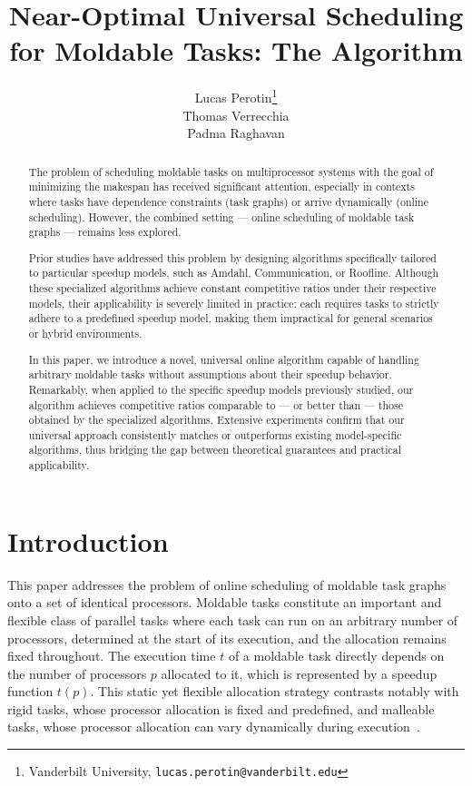 \documentclass{article}
\title{Near-Optimal Universal Scheduling for Moldable Tasks: The \fair Algorithm}
\author{
  Lucas Perotin\thanks{Vanderbilt University, \texttt{lucas.perotin@vanderbilt.edu}} \\
  Thomas Verrecchia \\
  Padma Raghavan\footnotemark[1]
}
\begin{document}
\maketitle
\begin{abstract}
The problem of scheduling moldable tasks on multiprocessor systems with the goal of minimizing the makespan has received significant attention, especially in contexts where tasks have dependence constraints (task graphs) or arrive dynamically (online scheduling). However, the combined setting — online scheduling of moldable task graphs — remains less explored.

Prior studies have addressed this problem by designing algorithms specifically tailored to particular speedup models, such as Amdahl, Communication, or Roofline. Although these specialized algorithms achieve constant competitive ratios under their respective models, their applicability is severely limited in practice: each requires tasks to strictly adhere to a predefined speedup model, making them impractical for general scenarios or hybrid environments.

In this paper, we introduce a novel, universal online algorithm capable of handling arbitrary moldable tasks without assumptions about their speedup behavior. Remarkably, when applied to the specific speedup models previously studied, our algorithm achieves competitive ratios comparable to — or better than — those obtained by the specialized algorithms. Extensive experiments confirm that our universal approach consistently matches or outperforms existing model-specific algorithms, thus bridging the gap between theoretical guarantees and practical applicability.
\end{abstract}
\section{Introduction}

This paper addresses the problem of online scheduling of moldable task graphs onto a set of identical processors. Moldable tasks constitute an important and flexible class of parallel tasks where each task can run on an arbitrary number of processors, determined at the start of its execution, and the allocation remains fixed throughout. The execution time $t$ of a moldable task directly depends on the number of processors $p$ allocated to it, which is represented by a speedup function $t(p)$. This static yet flexible allocation strategy contrasts notably with rigid tasks, whose processor allocation is fixed and predefined, and malleable tasks, whose processor allocation can vary dynamically during execution~\cite{Feitelson96}.
\end{document}
